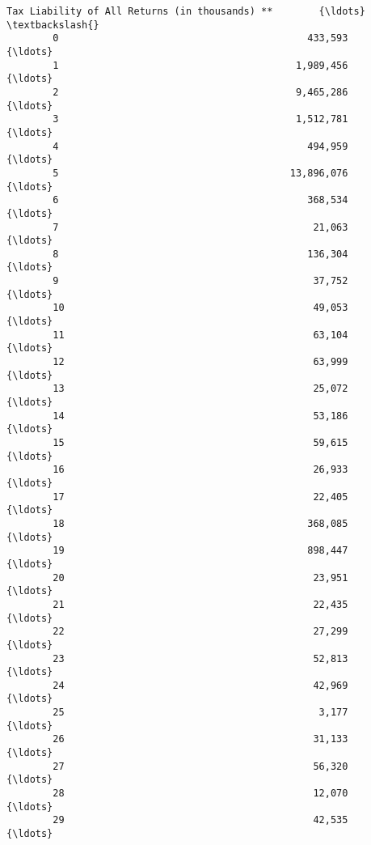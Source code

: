 \documentclass[11pt]{article}
\begin{document}
\begin{Verbatim}[commandchars=\\\{\}]
             Tax Liability of All Returns (in thousands) **        {\ldots}         \textbackslash{}
        0                                           433,593        {\ldots}          
        1                                         1,989,456        {\ldots}          
        2                                         9,465,286        {\ldots}          
        3                                         1,512,781        {\ldots}          
        4                                           494,959        {\ldots}          
        5                                        13,896,076        {\ldots}          
        6                                           368,534        {\ldots}          
        7                                            21,063        {\ldots}          
        8                                           136,304        {\ldots}          
        9                                            37,752        {\ldots}          
        10                                           49,053        {\ldots}          
        11                                           63,104        {\ldots}          
        12                                           63,999        {\ldots}          
        13                                           25,072        {\ldots}          
        14                                           53,186        {\ldots}          
        15                                           59,615        {\ldots}          
        16                                           26,933        {\ldots}          
        17                                           22,405        {\ldots}          
        18                                          368,085        {\ldots}          
        19                                          898,447        {\ldots}          
        20                                           23,951        {\ldots}          
        21                                           22,435        {\ldots}          
        22                                           27,299        {\ldots}          
        23                                           52,813        {\ldots}          
        24                                           42,969        {\ldots}          
        25                                            3,177        {\ldots}          
        26                                           31,133        {\ldots}          
        27                                           56,320        {\ldots}          
        28                                           12,070        {\ldots}          
        29                                           42,535        {\ldots}          

\end{Verbatim}
\end{document}

